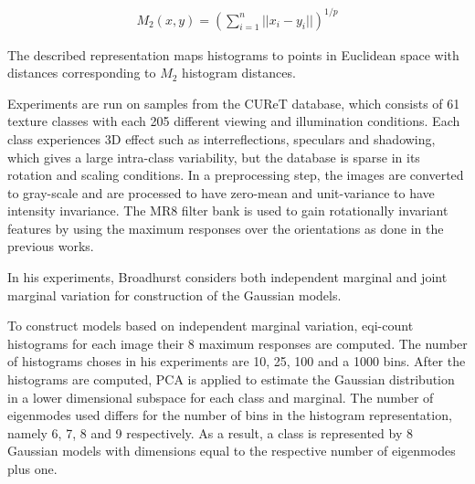 	\begin{eqnarray*}
		M_2(x, y) = (\sum^n_{i=1} ||x_i - y_i||)^{1/p}
	\end{eqnarray*}

The described representation maps histograms to points in Euclidean space with distances corresponding to $M_2$ histogram distances.

Experiments are run on samples from the CUReT database, which consists of 61 texture classes with each 205 different viewing and illumination conditions. Each class experiences 3D effect such as interreflections, speculars and shadowing, which gives a large intra-class variability, but the database is sparse in its rotation and scaling conditions. In a preprocessing step, the images are converted to gray-scale and are processed to have zero-mean and unit-variance to have intensity invariance. The MR8 filter bank is used to gain rotationally invariant features by using the maximum responses over the orientations as done in the previous works.


In his experiments, Broadhurst considers both independent marginal and joint marginal variation for construction of the Gaussian models. 

To construct models based on independent marginal variation, eqi-count histograms for each image their 8 maximum responses are computed. The number of histograms choses in his experiments are 10, 25, 100 and a 1000 bins. After the histograms are computed, PCA is applied to estimate the Gaussian distribution in a lower dimensional subspace for each class and marginal. The number of eigenmodes used differs for the number of bins in the histogram representation, namely 6, 7, 8 and 9 respectively. As a result, a class is represented by 8 Gaussian models with dimensions equal to the respective number of eigenmodes plus one. 

